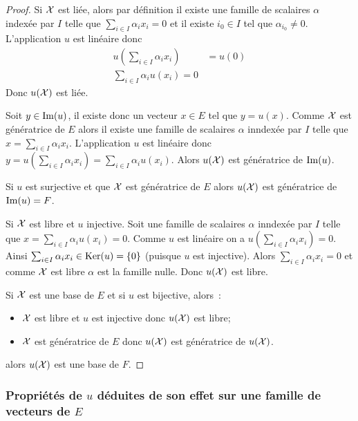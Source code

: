 \begin{proof}
  Si $\mathcal{X}$ est liée, alors par définition il existe une famille de scalaires $\alpha$ indexée par $I$ telle que $\sum_{i \in I} \alpha_i x_i =0$ et il existe $i_0 \in I$ tel que $\alpha_{i_0} \neq 0$. L'application $u$ est linéaire donc
  \begin{align}
    u\left(\sum_{i \in I} \alpha_i x_i \right) &= u(0) \\
    \sum_{i \in I} \alpha_i u(x_i) =0
  \end{align}
  Donc $u(\mathcal{X})$ est liée.

  Soit $y \in \operatorname{Im}(u)$, il existe donc un vecteur $x \in E$ tel que $y=u(x)$. Comme $\mathcal{X}$ est génératrice de $E$ alors il existe une famille de scalaires $\alpha$ inndexée par $I$ telle que $x = \sum_{i \in I} \alpha_i x_i$. L'application $u$ est linéaire donc $y = u\left(\sum_{i \in I} \alpha_i x_i \right)=\sum_{i \in I} \alpha_i u(x_i)$. Alors $u(\mathcal{X})$ est génératrice de $\operatorname{Im}(u)$.

  Si $u$ est surjective et que $\mathcal{X}$ est génératrice de $E$ alors $u(\mathcal{X})$ est génératrice de $\operatorname{Im}(u)=F$.

  Si $\mathcal{X}$ est libre et $u$ injective. Soit une famille de scalaires $\alpha$ inndexée par $I$ telle que $x = \sum_{i \in I} \alpha_i u(x_i)=0$. Comme $u$ est linéaire on a $u\left(\sum_{i \in I} \alpha_i x_i \right) =0$. Ainsi $\sum_{i \in I} \alpha_i x_i \in \operatorname{Ker}(u)=\{0\}$ (puisque $u$ est injective). Alors $\sum_{i \in I} \alpha_i x_i = 0$ et comme $\mathcal{X}$ est libre $\alpha$ est la famille nulle. Donc $u(\mathcal{X})$ est libre.

  Si $\mathcal{X}$ est une base de $E$ et si $u$ est bijective, alors~:
  \begin{itemize}
  \item $\mathcal{X}$ est libre et $u$ est injective donc $u(\mathcal{X})$ est libre;
  \item $\mathcal{X}$ est génératrice de $E$ donc $u(\mathcal{X})$ est génératrice de $u(\mathcal{X})$.
  \end{itemize}
  alors $u(\mathcal{X})$ est une base de $F$.
\end{proof}

\subsubsection{Propriétés de $u$ déduites de son effet sur une famille de vecteurs de $E$}

